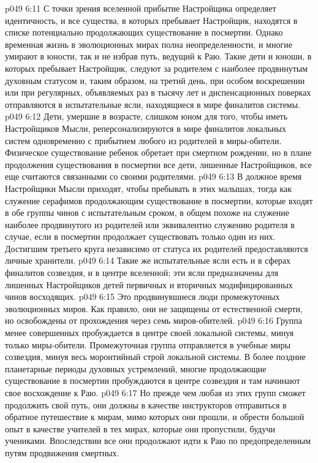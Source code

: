 \vs p049 6:11 \pc {}\bibnobreakspace {} С точки зрения вселенной прибытие Настройщика определяет идентичность, и все существа, в которых пребывает Настройщик, находятся в списке потенциально продолжающих существование в посмертии. Однако временная жизнь в эволюционных мирах полна неопределенности, и многие умирают в юности, так и не избрав путь, ведущий к Раю. Такие дети и юноши, в которых пребывает Настройщик, следуют за родителем с наиболее продвинутым духовным статусом и, таким образом, на третий день, при особом воскрешении или при регулярных, объявляемых раз в тысячу лет и диспенсационных поверках отправляются в испытательные ясли, находящиеся в мире финалитов системы.
\vs p049 6:12 Дети, умершие в возрасте, слишком юном для того, чтобы иметь Настройщиков Мысли, реперсонализируются в мире финалитов локальных систем одновременно с прибытием любого из родителей в миры\hyp{}обители. Физическое существование ребенок обретает при смертном рождении, но в плане продолжения существования в посмертии все дети, лишенные Настройщиков, все еще считаются связанными со своими родителями.
\vs p049 6:13 В должное время Настройщики Мысли приходят, чтобы пребывать в этих малышах, тогда как служение серафимов продолжающим существование в посмертии, которые входят в обе группы чинов с испытательным сроком, в общем похоже на служение наиболее продвинутого из родителей или эквивалентно служению родителя в случае, если в посмертии продолжает существовать только один из них. Достигшим третьего круга независимо от статуса их родителей предоставляются личные хранители.
\vs p049 6:14 Такие же испытательные ясли есть и в сферах финалитов созвездия, и в центре вселенной; эти ясли предназначены для лишенных Настройщиков детей первичных и вторичных модифицированных чинов восходящих.
\vs p049 6:15 \pc {}\bibnobreakspace {} Это продвинувшиеся люди промежуточных эволюционных миров. Как правило, они не защищены от естественной смерти, но освобождены от прохождения через семь миров\hyp{}обителей.
\vs p049 6:16 Группа менее совершенных пробуждается в центре своей локальной системы, минуя только миры\hyp{}обители. Промежуточная группа отправляется в учебные миры созвездия, минуя весь моронтийный строй локальной системы. В более поздние планетарные периоды духовных устремлений, многие продолжающие существование в посмертии пробуждаются в центре созвездия и там начинают свое восхождение к Раю.
\vs p049 6:17 Но прежде чем любая из этих групп сможет продолжить свой путь, они должны в качестве инструкторов отправиться в обратное путешествие к мирам, мимо которых они прошли, и обрести большой опыт в качестве учителей в тех мирах, которые они пропустили, будучи учениками. Впоследствии все они продолжают идти к Раю по предопределенным путям продвижения смертных.
